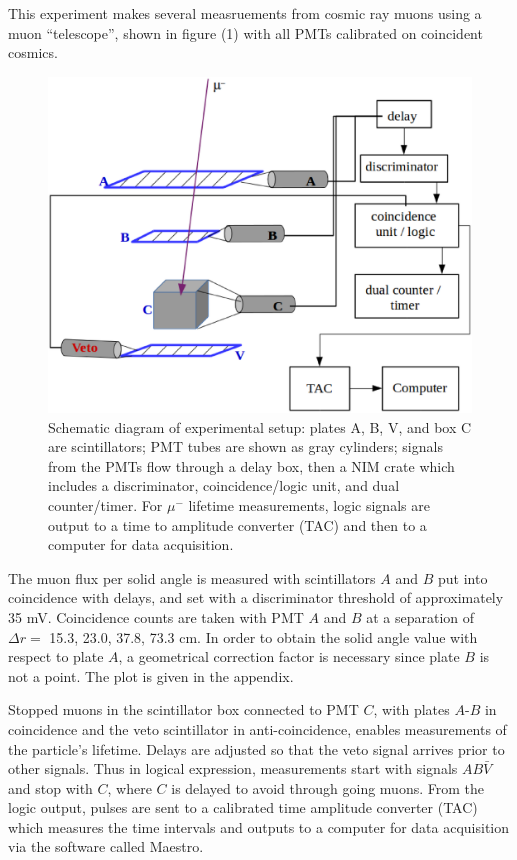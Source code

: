 \documentclass[11pt,twocolumn]{article}
\begin{document}
\indent \indent
This experiment makes several measruements from cosmic ray muons using a muon ``telescope'', shown in figure (1) with all PMTs calibrated on coincident cosmics. 
\begin{figure}[h]
\begin{center}
\includegraphics[scale=0.28]{countersetup.eps}
\caption{Schematic diagram of experimental setup: plates A, B, V, and box C are scintillators; PMT tubes are shown as gray cylinders; signals from the PMTs flow through a delay box, then a NIM crate which includes a discriminator, coincidence/logic unit, and dual counter/timer. For $\mu^{-}$ lifetime measurements, logic signals are output to a time to amplitude converter (TAC) and then to a computer for data acquisition. }
\label{Alpha2}
\end{center}
\end{figure}

The muon flux per solid angle is measured with scintillators $A$ and $B$ put into coincidence with delays, and set with a discriminator threshold of approximately 35 mV. Coincidence counts are taken with PMT $A$ and $B$ at a separation of $\Delta r =$ {15.3, 23.0, 37.8, 73.3} cm. In order to obtain the solid angle value with respect to plate $A$, a geometrical correction factor is necessary since plate $B$ is not a point. The plot is given in the appendix. \cite{browder}

Stopped muons in the scintillator box connected to PMT $C$, with plates $A$-$B$ in coincidence and the veto scintillator in anti-coincidence, enables measurements of the particle's lifetime. Delays are adjusted so that the veto signal arrives prior to other signals. Thus in logical expression, measurements start with signals $AB\bar{V}$ and stop with $C$, where $C$ is delayed to avoid through going muons. From the logic output, pulses are sent to a calibrated time amplitude converter (TAC) which measures the time intervals and outputs to a computer for data acquisition via the software called Maestro. \cite{browder} 
\end{document}
